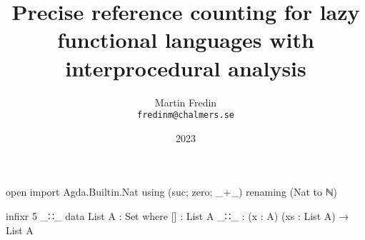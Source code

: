 \documentclass[10pt, twocolumn]{article}
\title{ Precise reference counting for lazy functional languages with interprocedural analysis}
\author{Martin Fredin \\ \texttt{fredinm@chalmers.se}}
\date{2023}
\begin{document}
\maketitle


\begin{code}[hide]
open import Agda.Builtin.Nat using (suc; zero; _+_) renaming (Nat to ℕ) 

infixr 5 _∷_
data List A : Set where
  []  : List A
  _∷_ : (x : A) (xs : List A) → List A
\end{code}


%
%
%
%
%    
%
\end{document}
